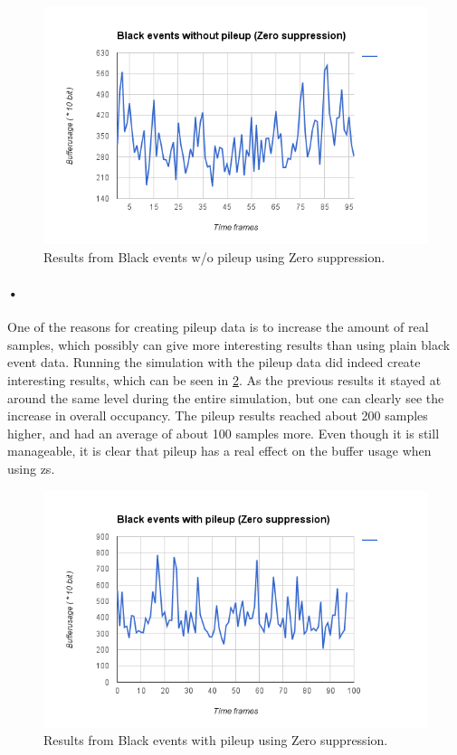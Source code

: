 \documentclass[a4paper, 12pt]{report}
\begin{document}
\begin{figure}[h!]
	\centering
		\includegraphics[width=1.0\textwidth]{images/blackevents-zs.png}
		\caption{Results from Black events w/o pileup using Zero suppression.}
		\label{fig:blackevents-zs}
\end{figure}

\paragraph{•}
One of the reasons for creating pileup data is to increase the amount of real samples, which possibly can give more interesting results than using plain black event data.
Running the simulation with the pileup data did indeed create interesting results, which can be seen in \ref{fig:blackevents-pileup-zs}.
As the previous results it stayed at around the same level during the entire simulation, but one can clearly see the increase in overall occupancy.
The pileup results reached about 200 samples higher, and had an average of about 100 samples more.
Even though it is still manageable, it is clear that pileup has a real effect on the buffer usage when using \gls{zs}.

\begin{figure}[h!]
	\centering
		\includegraphics[width=1.0\textwidth]{images/blackevents-pileup-zs.png}
		\caption{Results from Black events with pileup using Zero suppression.}
		\label{fig:blackevents-pileup-zs}
\end{figure}
\end{document}
